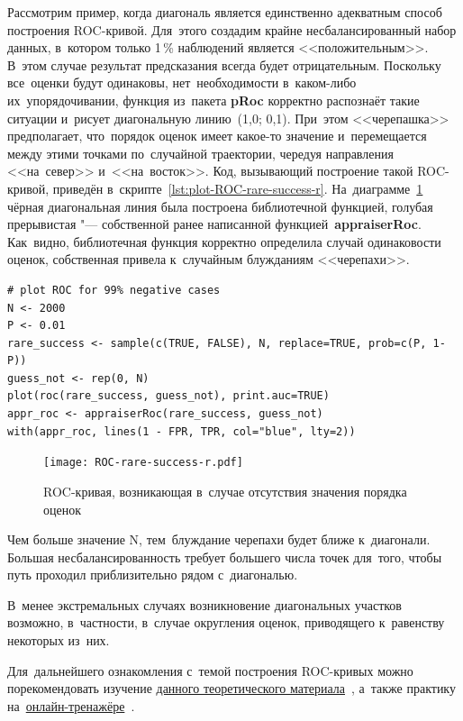 \documentclass[]{scrreprt}
\begin{document}
Рассмотрим пример, когда диагональ является единственно адекватным способ построения ROC-кривой. Для~этого создадим крайне несбалансированный набор данных, в~котором только 1\,\% наблюдений является <<положительным>>. В~этом случае результат предсказания всегда будет отрицательным. Поскольку все~оценки будут одинаковы, нет~необходимости в~каком-либо их~упорядочивании, функция из~пакета \textbf{pRoc} корректно распознаёт такие ситуации и~рисует диагональную линию~(1,0; 0,1). При~этом <<черепашка>> предполагает, что~порядок оценок имеет какое-то значение и~перемещается между этими точками по~случайной траектории, чередуя направления <<на~север>> и~<<на~восток>>. Код, вызывающий построение такой ROC-кривой, приведён в~скрипте~\ref{lst:plot-ROC-rare-success-r}. На~диаграмме~\ref{fig:ROC-rare-success-r} чёрная диагональная линия была построена библиотечной функцией, голубая прерывистая "--- собственной ранее написанной функцией~\textbf{appraiserRoc}. Как~видно, библиотечная функция корректно определила случай одинаковости оценок, собственная привела к~случайным блужданиям <<черепахи>>.
%
\begin{lstlisting}[float, caption = Построение ROC-кривой в~случае отсутвия значения порядка оценок, firstnumber=1, label= lst:plot-ROC-rare-success-r]
# plot ROC for 99% negative cases
N <- 2000
P <- 0.01
rare_success <- sample(c(TRUE, FALSE), N, replace=TRUE, prob=c(P, 1-P))
guess_not <- rep(0, N)
plot(roc(rare_success, guess_not), print.auc=TRUE)
appr_roc <- appraiserRoc(rare_success, guess_not)
with(appr_roc, lines(1 - FPR, TPR, col="blue", lty=2))
\end{lstlisting}
%
\begin{figure}[ht]
	\centering
	\texttt{[image: ROC-rare-success-r.pdf]}
	\caption{ROC-кривая, возникающая в~случае отсутствия значения порядка оценок}
	\label{fig:ROC-rare-success-r}
\end{figure}
%

Чем больше значение N, тем~блуждание черепахи будет ближе к~диагонали. Большая несбалансированность требует большего числа точек для~того, чтобы путь проходил приблизительно рядом с~диагональю.

В~менее экстремальных случаях возникновение диагональных участков возможно, в~частности, в~случае округления оценок, приводящего к~равенству некоторых из~них. 

Для~дальнейшего ознакомления с~темой построения ROC-кривых можно порекомендовать изучение \href{file:///home/kaarlahti/Downloads/ROCintro.pdf}{данного теоретического материала}~\cite{ROC-analysis}, а~также практику на~\href{https://kennis-research.shinyapps.io/ROC-Curves/}{онлайн-тренажёре}~\cite{ROC-curve-practice}.
\end{document}
